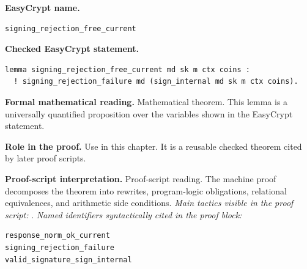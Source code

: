 \begin{formaltheorem}
\noindent\textbf{EasyCrypt name.}
\begin{lstlisting}[language=EasyCrypt,basicstyle=\ttfamily\scriptsize]
signing_rejection_free_current
\end{lstlisting}
\noindent\textbf{Checked EasyCrypt statement.}
\begin{lstlisting}[language=EasyCrypt,basicstyle=\ttfamily\scriptsize]
lemma signing_rejection_free_current md sk m ctx coins :
  ! signing_rejection_failure md (sign_internal md sk m ctx coins).
\end{lstlisting}
\noindent\textbf{Formal mathematical reading.}
Mathematical theorem. This lemma is a universally quantified proposition over the variables shown in the EasyCrypt statement.

\noindent\textbf{Role in the proof.}
Use in this chapter. It is a reusable checked theorem cited by later proof scripts.

\noindent\textbf{Proof-script interpretation.}
Proof-script reading. The machine proof decomposes the theorem into rewrites, program-logic obligations, relational equivalences, and arithmetic side conditions.
\emph{Main tactics visible in the proof script:} .
\emph{Named identifiers syntactically cited in the proof block:}
\begin{lstlisting}[language=EasyCrypt,basicstyle=\ttfamily\scriptsize]
response_norm_ok_current
signing_rejection_failure
valid_signature_sign_internal
\end{lstlisting}

\end{formaltheorem}


